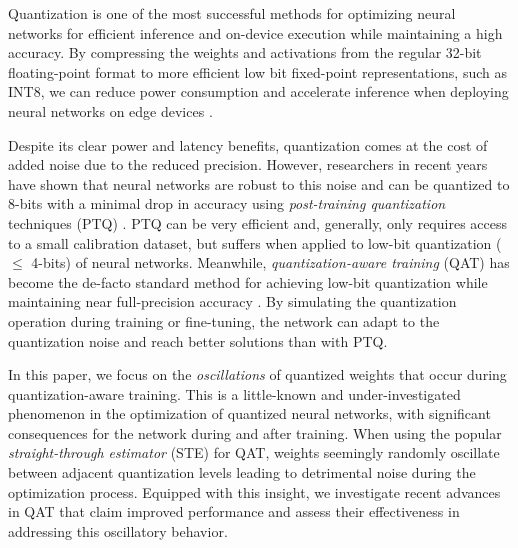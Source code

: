 Quantization is one of the most successful methods for optimizing neural networks for efficient inference and on-device execution while maintaining a high accuracy. By compressing the weights and activations from the regular 32-bit floating-point format to more efficient low bit fixed-point representations, such as INT8, we can reduce power consumption and accelerate inference when deploying neural networks on edge devices \citep{horowitz}.


Despite its clear power and latency benefits, quantization comes at the cost of added noise due to the reduced precision. However, researchers in recent years have shown that neural networks are robust to this noise and can be quantized to 8-bits with a minimal drop in accuracy using \textit{post-training quantization} techniques (PTQ) \citep{dfq, bannerposttraining, nahshan2020lapq}. PTQ can be very efficient and, generally, only requires access to a small calibration dataset, but suffers when applied to low-bit quantization ($\leq$ 4-bits) of neural networks. Meanwhile, \textit{quantization-aware training} (QAT) has become the de-facto standard method for achieving low-bit quantization while maintaining near full-precision accuracy \citep{krishnamoorthi,lsq, whitepaper}. By simulating the quantization operation during training or fine-tuning, the network can adapt to the quantization noise and reach better solutions than with PTQ.  
 


In this paper, we focus on the \textit{oscillations} of quantized weights that occur during quantization-aware training. This is a little-known and under-investigated phenomenon in the optimization of quantized neural networks, with significant consequences for the network during and after training. When using the popular \textit{straight-through estimator} (STE) \citep{bengio2013estimating} for QAT, weights seemingly randomly oscillate between adjacent quantization levels leading to detrimental noise during the optimization process. Equipped with this insight, we investigate recent advances in QAT that claim improved performance and assess their effectiveness in addressing this oscillatory behavior.

